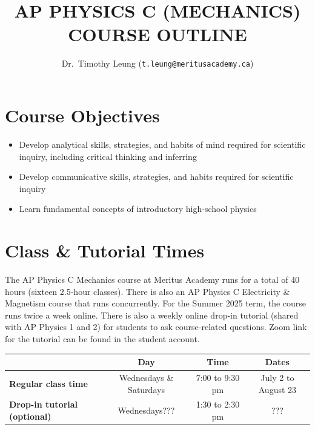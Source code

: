 \documentclass{../../../oss-handout}
\title{AP PHYSICS C (MECHANICS) COURSE OUTLINE}
\author{Dr.\ Timothy Leung (\texttt{t.leung@meritusacademy.ca})}
\begin{document}
\thispagestyle{title}
\gentitle


\section{Course Objectives}
\begin{itemize}[nosep]
\item Develop analytical skills, strategies, and habits of mind required for
  scientific inquiry, including critical thinking and inferring
\item Develop communicative skills, strategies, and habits required for
  scientific inquiry
\item Learn fundamental concepts of introductory high-school physics
\end{itemize}






\section{Class \& Tutorial Times}
The AP Physics C Mechanics course at Meritus Academy runs for a total of 40
hours (sixteen 2.5-hour classes). There is also an AP Physics C Electricity \&
Magnetism course that runs concurrently. For the Summer 2025 term, the course
runs twice a week online. There is also a weekly online drop-in tutorial
(shared with AP Physics 1 and 2) for students to ask course-related questions.
Zoom link for the tutorial can be found in the student account.

\bgroup
\def\arraystretch{1.25}
\begin{tabular}{|p{1.9in}|c|c|c|}
  \rowcolor{lightgray}
  \hline
  & \textbf{Day} & \textbf{Time} & \textbf{Dates} \\
  \hline\hline
  
  \textbf{Regular class time} &
  \hspace{.1in}Wednesdays \& Saturdays\hspace{.1in} &
  \hspace{.1in}7:00 to 9:30 pm\hspace{.1in} &
  July 2 to August 23 \\
  \hline
  
  \textbf{Drop-in tutorial (optional)} &
  Wednesdays??? & 1:30 to 2:30 pm & ??? \\
  \hline
\end{tabular}
\egroup
\end{document}
